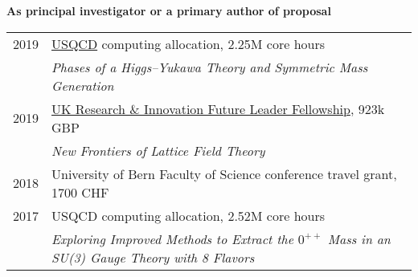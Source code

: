 \renewenvironment{spacelist} {
  \begin{list} {} {
    \setlength{\topsep}{-8 pt}
    \setlength{\itemsep}{5 pt}
    \setlength{\leftmargin}{-1.15 in}
  }
}{
  \end{list}
}

\raggedright
\vspace{12 pt}
\begin{spacelist}
  \item {\large \bfseries As principal investigator or a primary author of proposal} \\[10 pt]
    \begin{tabular}[t]{cl}
      2019 & \href{http://www.usqcd.org}{USQCD} computing allocation, 2.25M core hours                                                                                                                                                 \\ %
           & \textit{Phases of a Higgs--Yukawa Theory and Symmetric Mass Generation}                                                                                                                                                   \\[6 pt]
      2019 & \href{https://www.ukri.org/funding/funding-opportunities/future-leaders-fellowships/meet-our-future-leaders-fellows/david-schaich-university-of-liverpool/}{UK Research \& Innovation Future Leader Fellowship}, 923k GBP \\
           & \textit{New Frontiers of Lattice Field Theory}                                                                                                                                                                            \\[6 pt]
      2018 & University of Bern Faculty of Science conference travel grant, 1700 CHF                                                                                                                                                   \\[6 pt]
      2017 & USQCD computing allocation, 2.52M core hours                                                                                                                                                                              \\ %
           & \textit{Exploring Improved Methods to Extract the $0^{++}$ Mass in an SU(3) Gauge Theory with 8 Flavors}                                                                                                                  \\[6 pt]

\end{tabular}
\end{spacelist}
